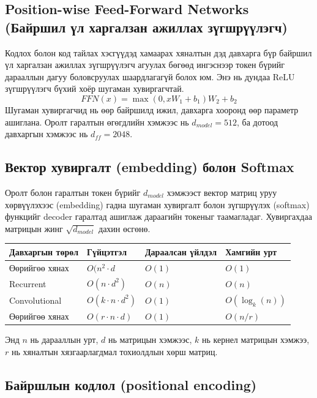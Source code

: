 \documentclass[11pt,a4paper]{article}
\begin{document}
\subsection{Position-wise Feed-Forward Networks (Байршил үл харгалзан ажиллах зүгшрүүлэгч)}
\label{sec:org34d512b}

Кодлох болон код тайлах хэсгүүдэд хамаарах хяналтын дэд давхарга бүр байршил үл харгалзан ажиллах зүгшрүүлэгч агуулах бөгөөд ингэснээр токен бүрийг дарааллын дагуу боловсруулах шаардлагагүй болох юм. Энэ нь дундаа ReLU зүгшрүүлэгч бүхий хоёр шугаман хувиргагчтай. $$FFN(x)=\max(0,xW_1+b_1)W_2+b_2$$
Шугаман хувиргагчид нь өөр байршилд ижил, давхарга хооронд өөр параметр ашиглана. Оролт гаралтын өгөгдлийн хэмжээс нь \(d_{model}=512\), ба дотоод давхаргын хэмжээс нь \(d_{ff}=2048\).
\subsection{Вектор хувиргалт (embedding) болон Softmax}
\label{sec:org7f82e91}

Оролт болон гаралтын токен бүрийг \(d_{model}\) хэмжээст вектор матриц уруу хөрвүүлэхээс (embedding) гадна шугаман хувиргалт болон зүгшрүүлэх (softmax) функцийг decoder гаралтад ашиглаж дараагийн токеныг таамагладаг. Хувиргахдаа матрицын жинг \(\sqrt{d_{model}}\) дахин өсгөнө.

\begin{center}
\begin{tabular}{llll}
\hline
Давхаргын төрөл & Гүйцэтгэл & Дараалсан үйлдэл & Хамгийн урт\\
\hline
Өөрийгөө хянах & \(O(n^2\cdot d\) & \(O(1)\) & \(O(1)\)\\
Recurrent & \(O(n\cdot d^2)\) & \(O(n)\) & \(O(n)\)\\
Convolutional & \(O(k\cdot n\cdot d^2)\) & \(O(1)\) & \(O(\log_k(n))\)\\
Өөрийгөө хянах\footnotemark & \(O(r\cdot n\cdot d)\) & \(O(1)\) & \(O(n/r)\)\\
\hline
\end{tabular}
\end{center}

Энд \(n\) нь дарааллын урт, \(d\) нь матрицын хэмжээс, \(k\) нь кернел матрицын хэмжээ, \(r\) нь хяналтын хязгаарлагдмал тохиолдлын хөрш матриц.
\subsection{Байршлын кодлол (positional encoding)}
\label{sec:orge85ddca}
\end{document}
